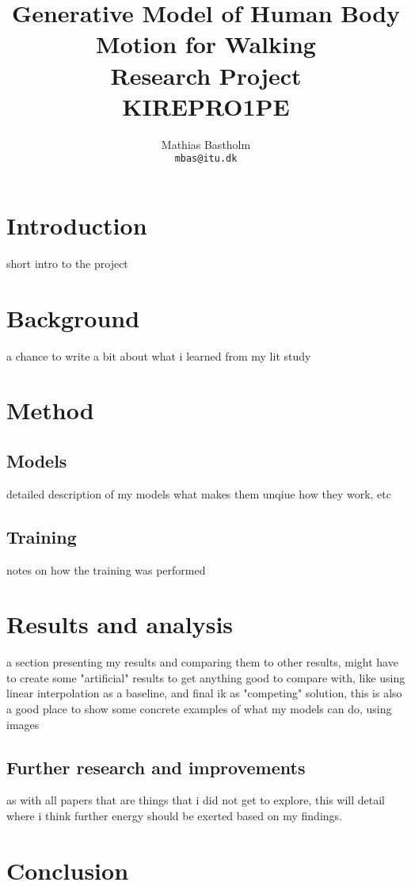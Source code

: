 \documentclass{article}
\title{%
    Generative Model of Human Body Motion for Walking\\
    \large Research Project\\
    \small KIREPRO1PE
}
\author{%
    Mathias Bastholm\\
    \texttt{mbas@itu.dk}
}
\begin{document}
\maketitle

\section{Introduction}\label{sec:introduction}
short intro to the project

\section{Background}\label{sec:background}
a chance to write a bit about what i learned from my lit study

\section{Method}\label{sec:method}
\subsection{Models}\label{subsec:models}
detailed description of my models what makes them unqiue how they work, etc
\subsection{Training}\label{subsec:training}
notes on how the training was performed

\section{Results and analysis}\label{sec:analysis}
a section presenting my results and comparing them to other results, might have to create some "artificial" results
to get anything good to compare with, like using linear interpolation as a baseline, and final ik as "competing"
solution, this is also a good place to show some concrete examples of what my models can do, using images

\subsection{Further research and improvements}\label{subsec:furtherresearch}
as with all papers that are things that i did not get to explore, this will detail where i think further energy should
be exerted based on my findings.

\section{Conclusion}\label{sec:conclusion}

\newpage

\printbibliography%
\end{document}
